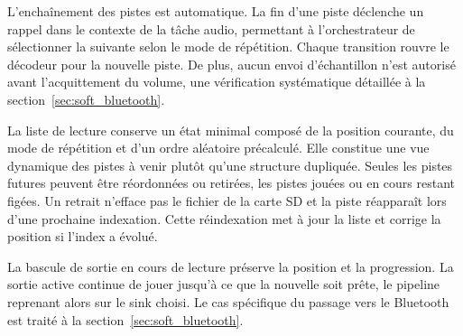 L'enchaînement des pistes est automatique. La fin d'une piste déclenche un rappel dans le contexte de la tâche audio, permettant à l'orchestrateur de sélectionner la suivante selon le mode de répétition. Chaque transition rouvre le décodeur pour la nouvelle piste. De plus, aucun envoi d'échantillon n'est autorisé avant l'acquittement du volume, une vérification systématique détaillée à la section~\ref{sec:soft_bluetooth}.

La liste de lecture conserve un état minimal composé de la position courante, du mode de répétition et d'un ordre aléatoire précalculé. Elle constitue une vue dynamique des pistes à venir plutôt qu'une structure dupliquée. Seules les pistes futures peuvent être réordonnées ou retirées, les pistes jouées ou en cours restant figées. Un retrait n'efface pas le fichier de la carte SD et la piste réapparaît lors d'une prochaine indexation. Cette réindexation met à jour la liste et corrige la position si l'index a évolué.

La bascule de sortie en cours de lecture préserve la position et la progression. La sortie active continue de jouer jusqu'à ce que la nouvelle soit prête, le pipeline reprenant alors sur le \gls{sink} choisi. Le cas spécifique du passage vers le Bluetooth est traité à la section~\ref{sec:soft_bluetooth}.